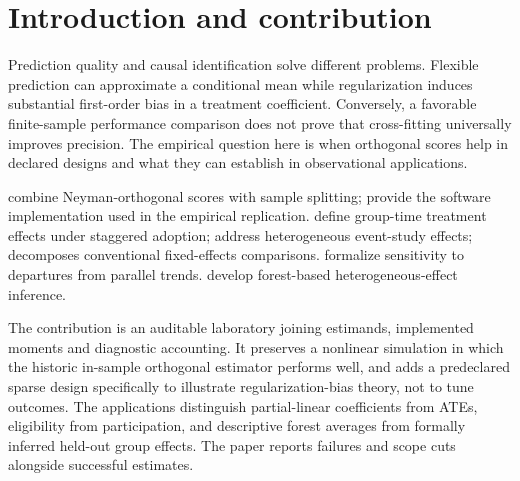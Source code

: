 \begin{abstract}
We ask when orthogonal scores improve treatment-effect estimation relative to regularized plug-in methods. We compare two Monte Carlo designs and apply partially linear, interactive-regression and staggered-adoption estimators to retirement-account and county-employment examples. In the sparse simulation, plug-in bias is \SparsePluginBias{} versus \SparseDMLBias{} for cross-fitted double machine learning, whose coverage is \SparseDMLCoverage{} percent. In the nonlinear design, the in-sample orthogonal comparator has bias \OriginalNaiveBias{}, showing that sample splitting does not imply a universal finite-sample ranking. The retirement-account random-forest ATE is \$\PensionPoint{}. Orthogonality reduces nuisance-estimation sensitivity but does not establish unconfoundedness, parallel trends or policy transportability.
\end{abstract}
\section{Introduction and contribution}
Prediction quality and causal identification solve different problems. Flexible prediction can approximate a conditional mean while regularization induces substantial first-order bias in a treatment coefficient. Conversely, a favorable finite-sample performance comparison does not prove that cross-fitting universally improves precision. The empirical question here is when orthogonal scores help in declared designs and what they can establish in observational applications.

\citet{dml} combine Neyman-orthogonal scores with sample splitting; \citet{doubleml} provide the software implementation used in the empirical replication. \citet{cs} define group-time treatment effects under staggered adoption; \citet{sa} address heterogeneous event-study effects; \citet{bacon} decomposes conventional fixed-effects comparisons. \citet{honest} formalize sensitivity to departures from parallel trends. \citet{forest} develop forest-based heterogeneous-effect inference.

The contribution is an auditable laboratory joining estimands, implemented moments and diagnostic accounting. It preserves a nonlinear simulation in which the historic in-sample orthogonal estimator performs well, and adds a predeclared sparse design specifically to illustrate regularization-bias theory, not to tune outcomes. The applications distinguish partial-linear coefficients from ATEs, eligibility from participation, and descriptive forest averages from formally inferred held-out group effects. The paper reports failures and scope cuts alongside successful estimates.
